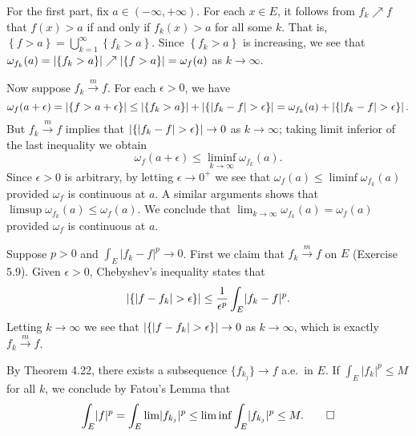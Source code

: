 \begin{exercise}{4.18}
  For the first part, fix $a \in (-\infty, +\infty)$.
  For each $x \in E$,
  it follows from $f_k \nearrow f$ that
  $f(x) > a$ if and only if $f_k(x) > a$ for all some $k$.
  That is, $\left\{ f > a \right\} = \bigcup_{k=1}^{\infty} \left\{ f_k > a \right\}$.
  Since $\left\{ f_k > a \right\}$ is increasing,
  we see that $\omega_{f_k}(a) = \left\vert\left\{ f_k > a \right\}\right\vert \nearrow
  \left\vert\left\{ f > a \right\}\right\vert = \omega_f(a)$ as $k \rightarrow \infty$.

  Now suppose $f_k \xrightarrow{m} f$.
  For each $\epsilon > 0$, we have
  \[
    \omega_f(a + \epsilon) = \left\vert\left\{ f > a + \epsilon \right\}\right\vert \le
    \left\vert\left\{ f_k > a \right\}\right\vert + \left\vert\left\{ \lvert f_k - f \rvert > \epsilon \right\}\right\vert
    = \omega_{f_k}(a) + \left\vert\left\{ \lvert f_k - f \rvert > \epsilon \right\}\right\vert.
  \]
  But $f_k \xrightarrow{m} f$ implies that
  $\left\vert\left\{ \lvert f_k - f \rvert > \epsilon \right\}\right\vert \rightarrow 0$
  as $k \rightarrow \infty$;
  taking limit inferior of the last inequality we obtain
  \[
    \omega_f(a + \epsilon) \le \liminf_{k \rightarrow \infty} \omega_{f_k}(a).
  \]
  Since $\epsilon > 0$ is arbitrary,
  by letting $\epsilon \rightarrow 0^+$ we see that
  $\omega_f(a) \le \liminf \omega_{f_k}(a)$
  provided $\omega_f$ is continuous at $a$.
  A similar arguments shows that $\limsup \omega_{f_k}(a) \le \omega_f(a)$.
  We conclude that $\lim_{k \rightarrow \infty} \omega_{f_k}(a) = \omega_f(a)$
  provided $\omega_f$ is continuous at $a$.
\end{exercise}

\begin{exercise}{5.10}
  Suppose $p > 0$ and $\int_E \lvert f_k - f \rvert^p \rightarrow 0$.
  First we claim that $f_k \xrightarrow{m} f$ on $E$ (Exercise 5.9).
  Given $\epsilon > 0$, Chebyshev's inequality states that
  \[
    \left\vert\left\{ \lvert f - f_k \rvert > \epsilon \right\}\right\vert
    \le \frac{1}{\epsilon^p} \int_E \lvert f_k - f \rvert^p.
  \]
  Letting $k \rightarrow \infty$
  we see that $\left\vert\left\{ \lvert f - f_k \rvert > \epsilon \right\}\right\vert \rightarrow 0$
  as $k \rightarrow \infty$,
  which is exactly $f_k \xrightarrow{m} f$.

  By Theorem 4.22, there exists a subsequence $\{f_{k_j}\} \rightarrow f$ a.e.\ in $E$.
  If $\int_E \lvert f_k \rvert^p \le M$ for all $k$,
  we conclude by Fatou's Lemma that
  \[
    \int_E \lvert f \rvert^p = \int_E \lim \lvert f_{k_j} \rvert^p
    \le \liminf \int_E \lvert f_{k_j} \rvert^p \le M.
    \qedhere
  \]
\end{exercise}

